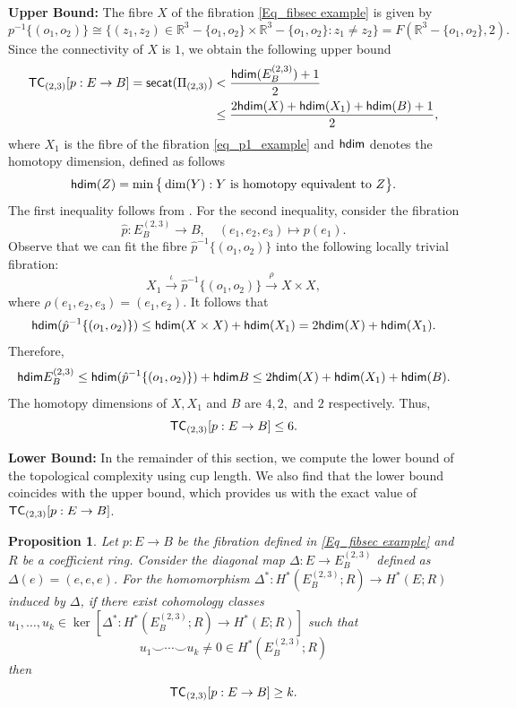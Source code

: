 \documentclass[12pt,oneside,reqno]{amsart}
\theoremstyle{plain}
\newtheorem{proposition}[theorem]{Proposition}
\theoremstyle{definition}
\theoremstyle{remark}
\newcommand{\hdim}{{\sf {hdim}}}
\newcommand{\secat}{{\sf {secat}}}
\newcommand{\TC}{{\sf {TC}}}
\newcommand{\rr}{{\mathbb {R}}}
\begin{document}
\vspace{.25cm}
\noindent \textbf{Upper Bound:} 
The fibre $X$ of the fibration \eqref{Eq_fibsec example} is given by 
$$p^{-1}\{(o_1, o_2)\} \cong \{(z_1,z_2)\in \rr^3-\{o_1, o_2\} \times \rr^3-\{o_1, o_2\}: z_1\neq z_2 \} = F(\rr^3-\{o_1, o_2\},2).$$
Since the connectivity of $X$ is $1$, we obtain the following upper bound
\begin{align*}
\TC_{(2, 3)}[p: E \to B]=\secat(\Pi_{(2, 3)}) &<  \frac{\hdim (E_B^{(2, 3)})+1}{2} \\
&\leq \frac{ 2 \hdim (X) +\hdim (X_1) + \hdim (B) + 1}{2},
\end{align*}
where $X_1$ is the fibre of the fibration \eqref{eq_p1_example} and $\hdim$ denotes the homotopy dimension, defined as follows $$\hdim(Z)= \min \big\{\dim(Y): Y \text{ is homotopy equivalent to } Z \big\}.$$
The first inequality follows from \cite[Theorem 5]{Sva66}. For the second inequality, consider the fibration
\[
\hat{p} : E_B^{(2,3)} \to B, \quad (e_1, e_2, e_3) \mapsto p(e_1).
\]
Observe that we can fit the fibre \(\hat{p}^{-1}\{(o_1,o_2)\}\) into the following locally trivial fibration:
\[
X_1 \xrightarrow{\iota} \hat{p}^{-1}\{(o_1,o_2)\} \xrightarrow{\rho} X \times X,
\]
where \(\rho (e_1, e_2, e_3) = (e_1, e_2)\). It follows that $$\hdim(\hat{p}^{-1}\{(o_1,o_2)\}) \leq \hdim(X\times X) + \hdim(X_1) = 2\hdim(X)+ \hdim(X_1).$$
Therefore,
$$\hdim E_B^{(2, 3)} \leq \hdim (\hat{p}^{-1}\{(o_1,o_2)\}) + \hdim B \leq 2\hdim(X)+ \hdim(X_1) + \hdim(B).$$ The homotopy dimensions of $X, X_1$ and $B$ are $4, 2,$ and $2$ respectively. Thus, $$\TC_{(2, 3)}[p: E \to B]\leq 6.$$

\vspace{.25cm}
\noindent \textbf{Lower Bound:} In the remainder of this section, we compute the lower bound of the topological complexity using cup length. We also find that the lower bound coincides with the upper bound, which provides us with the exact value of $\TC_{(2, 3)}[p: E \to B]$.

\begin{proposition}\label{Prop_cup product example}
Let $p\colon E\to B$ be the fibration defined in \eqref{Eq_fibsec example} and $R$ be a coefficient ring. Consider the diagonal map $\Delta : E \to E^{(2, 3)}_B$ defined as $\Delta(e)= (e, e, e)$. For the homomorphism $\Delta^\ast: H^\ast(E^{(2, 3)}_B;R) \to H^\ast(E;R)$ induced by $\Delta$, if there exist cohomology classes $u_1, \ldots, u_k \in \ker[\Delta^* : H^\ast(E^{(2, 3)}_B;R) \to H^*(E; R)]$ such that $$u_1 \smile \cdots \smile u_k \neq 0 \in H^\ast(E^{(2, 3)}_B;R)$$ then $$\TC_{(2, 3)}[p: E \to B] \geq k.$$ 
\end{proposition}
\end{document}
